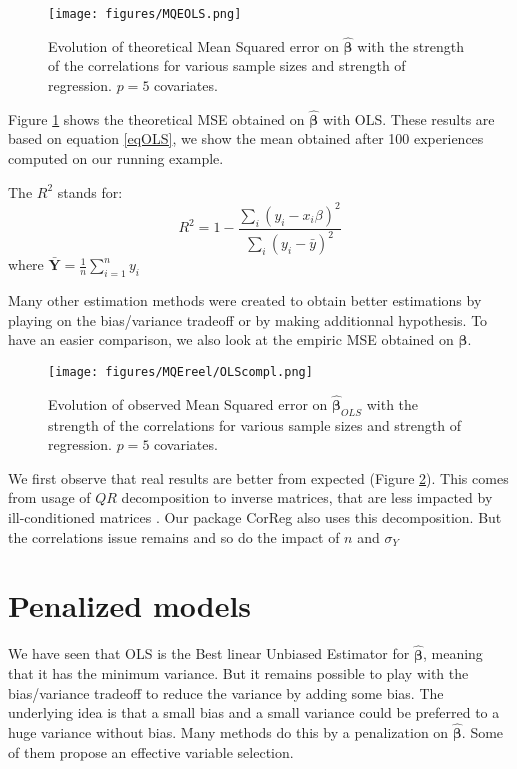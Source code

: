 \documentclass[12pt,a4paper]{report}
\begin{document}
	 \begin{figure}
	 \centering
	  \texttt{[image: figures/MQEOLS.png]}
	  \caption{Evolution of theoretical Mean Squared error on $\hat{\boldsymbol{\beta}}$ with the strength of the correlations for various sample sizes and strength of regression. $p=5$ covariates. } \label{MQEOLS1}
	\end{figure}
	
	Figure \ref{MQEOLS1} shows the theoretical MSE obtained on $\hat{\boldsymbol{\beta}}$ with OLS. These results are based on equation \ref{eqOLS}, we show the mean obtained after 100 experiences computed on our running example.
	
	The $R^2$ stands for:
	\begin{equation}\label{defR2}
	R^2=1-\frac{\sum_i (y_i - x_i\beta)^2}{\sum_i (y_i-\bar{y})^2}
	\end{equation}
	where $\bar{\boldsymbol{Y}}=\frac{1}{n}\sum_{i=1}^n y_i $
	
	
	Many other estimation methods were created to obtain better estimations by playing on the bias/variance tradeoff or by making additionnal hypothesis.
	To have an easier comparison, we also look at the empiric MSE obtained on $\hat{\boldsymbol{\beta}}$.
		
	
	
	 \begin{figure}
	 \centering
	  \texttt{[image: figures/MQEreel/OLScompl.png]}
	  \caption{Evolution of observed Mean Squared error on $\hat{\boldsymbol{\beta}}_{OLS}$ with the strength of the correlations for various sample sizes and strength of regression. $p=5$ covariates. } \label{MQEOLScompl}
	\end{figure}	
	We first observe that real results are better from expected (Figure \ref{MQEOLScompl}). This comes from usage of $QR$ decomposition to inverse matrices, that are less impacted by ill-conditioned matrices \cite{bulirsch2002introduction}. Our package CorReg also uses this decomposition. But the correlations issue remains and so do the impact of $n$ and $\sigma_Y$
	
	\section{Penalized models}
	
	We have seen that OLS is the Best linear Unbiased Estimator for $\hat{\boldsymbol{\beta}}$, meaning that it has the minimum variance. But it remains possible to play with the bias/variance tradeoff to reduce the variance by adding some bias. The underlying idea is that a small bias and a small variance could be preferred to a huge variance without bias. Many methods do this by a penalization on  $\hat{\boldsymbol{\beta}}$.  Some of them propose an effective variable selection.
\end{document}
